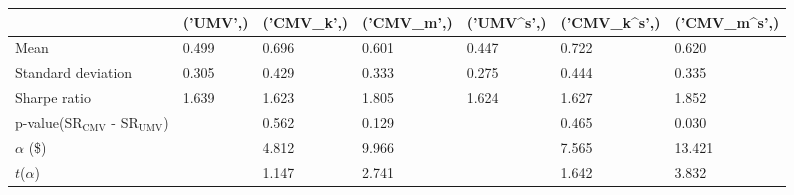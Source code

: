 \begin{tabular}{lllllll}
\toprule
 & ('UMV',) & ('CMV_k',) & ('CMV_m',) & ('UMV^s',) & ('CMV_k^s',) & ('CMV_m^s',) \\
\midrule
Mean & 0.499 & 0.696 & 0.601 & 0.447 & 0.722 & 0.620 \\
Standard deviation & 0.305 & 0.429 & 0.333 & 0.275 & 0.444 & 0.335 \\
Sharpe ratio & 1.639 & 1.623 & 1.805 & 1.624 & 1.627 & 1.852 \\
p-value(SR$_{\text{CMV}}$ - SR$_{\text{UMV}}$) &  & 0.562 & 0.129 &  & 0.465 & 0.030 \\
$\alpha$ (\$) &  & 4.812 & 9.966 &  & 7.565 & 13.421 \\
$t$($\alpha$) &  & 1.147 & 2.741 &  & 1.642 & 3.832 \\
\bottomrule
\end{tabular}
